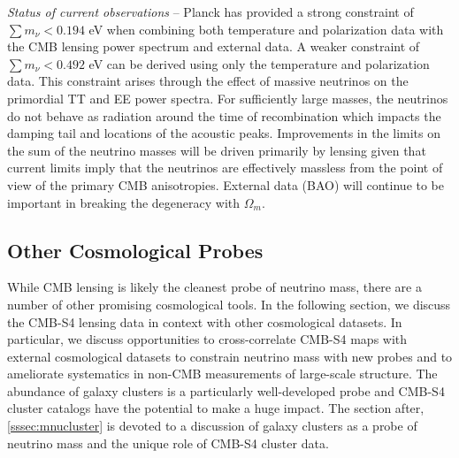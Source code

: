 {\it Status of current observations} -- Planck has provided a strong constraint of $\sum m_\nu < 0.194$ eV when combining both temperature and polarization data with the CMB lensing power spectrum and external data.  A weaker constraint of $\sum m_\nu < 0.492$ eV can be derived using only the temperature and polarization data.  This constraint arises through the effect of massive neutrinos on the primordial TT and EE power spectra.  For sufficiently large masses, the neutrinos do not behave as radiation around the time of recombination which impacts the damping tail and locations of the acoustic peaks.  Improvements in the limits on the sum of the neutrino masses will be driven primarily by lensing given that current limits imply that the neutrinos are effectively massless from the point of view of the primary CMB anisotropies.  External data (BAO) will continue to be important in breaking the degeneracy with $\Omega_m$.  

\subsection{Other Cosmological Probes}

While CMB lensing is likely the cleanest probe of neutrino mass, there are a number of other promising cosmological tools. In the following section, we discuss the CMB-S4 lensing data in context with other cosmological datasets. In particular, we discuss opportunities to cross-correlate CMB-S4 maps with external cosmological datasets to constrain neutrino mass with new probes and to ameliorate systematics in non-CMB measurements of large-scale structure. The abundance of galaxy clusters is a particularly well-developed probe and CMB-S4 cluster catalogs have the potential to make a huge impact. The section after, \ref{sssec:mnucluster} is devoted to a discussion of galaxy clusters as a probe of neutrino mass and the unique role of CMB-S4 cluster data.

